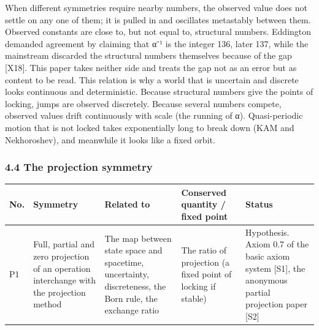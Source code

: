 \documentclass[
  a4paper,
]{article}
\newcounter{none} %
\begin{document}
When different symmetries require nearby numbers, the observed value
does not settle on any one of them; it is pulled in and oscillates
metastably between them. Observed constants are close to, but not equal
to, structural numbers. Eddington demanded agreement by claiming that
α⁻¹ is the integer 136, later 137, while the mainstream discarded the
structural numbers themselves because of the gap {[}X18{]}. This paper
takes neither side and treats the gap not as an error but as content to
be read. This relation is why a world that is uncertain and discrete
looks continuous and deterministic. Because structural numbers give the
points of locking, jumps are observed discretely. Because several
numbers compete, observed values drift continuously with scale (the
running of α). Quasi-periodic motion that is not locked takes
exponentially long to break down (KAM and Nekhoroshev), and meanwhile it
looks like a fixed orbit.

\subsubsection{4.4 The projection
symmetry}\label{the-projection-symmetry}

{\def\LTcaptype{none} %
\begin{longtable}[]{@{}
  >{\raggedright\arraybackslash}p{}
  >{\raggedright\arraybackslash}p{}
  >{\raggedright\arraybackslash}p{}
  >{\raggedright\arraybackslash}p{}
  >{\raggedright\arraybackslash}p{}@{}}
\toprule\noalign{}
\begin{minipage}[b]{\linewidth}\raggedright
No.
\end{minipage} & \begin{minipage}[b]{\linewidth}\raggedright
Symmetry
\end{minipage} & \begin{minipage}[b]{\linewidth}\raggedright
Related to
\end{minipage} & \begin{minipage}[b]{\linewidth}\raggedright
Conserved quantity / fixed point
\end{minipage} & \begin{minipage}[b]{\linewidth}\raggedright
Status
\end{minipage} \\
\midrule\noalign{}
\endhead
\bottomrule\noalign{}
\endlastfoot
P1 & Full, partial and zero projection of an operation interchange with
the projection method & The map between state space and spacetime,
uncertainty, discreteness, the Born rule, the exchange ratio & The ratio
of projection (a fixed point of locking if stable) & Hypothesis. Axiom
0.7 of the basic axiom system {[}S1{]}, the anonymous partial projection
paper {[}S2{]} \\
\end{longtable}
}
\end{document}
